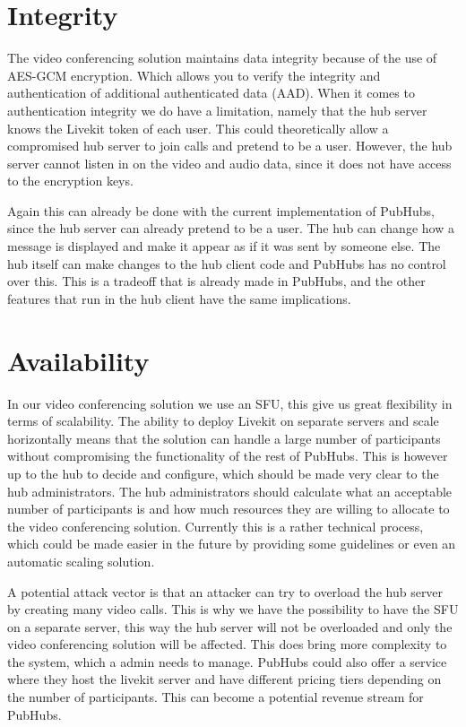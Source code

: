 \documentclass{report}
\begin{document}
\section{Integrity}
The video conferencing solution maintains data integrity because of the use of AES-GCM encryption. Which allows you
to verify the integrity and authentication of additional authenticated data (AAD). When it comes to authentication
integrity we do have a limitation, namely that the hub server knows the Livekit token of each user. This could
theoretically allow a compromised hub server to join calls and pretend to be a user. However, the hub server cannot
listen in on the video and audio data, since it does not have access to the encryption keys.

Again this can already be done with the current implementation of PubHubs, since the hub server can already pretend to
be a user. The hub can change how a message is displayed and make it appear as if it was sent by someone else. The
hub itself can make changes to the hub client code and PubHubs has no control over this. This is a tradeoff that is
already made in PubHubs, and the other features that run in the hub client have the same implications.

\section{Availability}
In our video conferencing solution we use an SFU, this give us great flexibility in terms of scalability. The
ability to deploy Livekit on separate servers and scale horizontally means that the solution can handle a large
number of participants without compromising the functionality of the rest of PubHubs. This is however up to the hub
to decide and configure, which should be made very clear to the hub administrators. The hub administrators should
calculate what an acceptable number of participants is and how much resources they are willing to allocate to the
video conferencing solution. Currently this is a rather technical process, which could be made easier in the future
by providing some guidelines or even an automatic scaling solution.

A potential attack vector is that an attacker can try to overload the hub server by creating many video calls. This
is why we have the possibility to have the SFU on a separate server, this way the hub server will not be overloaded
and only the video conferencing solution will be affected. This does bring more complexity to the system, which a
admin needs to manage. PubHubs could also offer a service where they host the livekit server and have different
pricing tiers depending on the number of participants. This can become a potential revenue stream for PubHubs.
\end{document}
